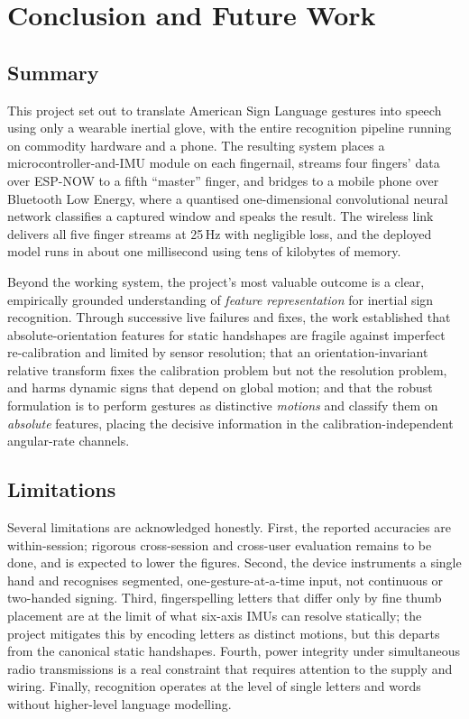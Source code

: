 \chapter{Conclusion and Future Work}

\section{Summary}

This project set out to translate American Sign Language gestures into speech
using only a wearable inertial glove, with the entire recognition pipeline
running on commodity hardware and a phone. The resulting system places a
microcontroller-and-IMU module on each fingernail, streams four fingers' data
over ESP-NOW to a fifth ``master'' finger, and bridges to a mobile phone over
Bluetooth Low Energy, where a quantised one-dimensional convolutional neural
network classifies a captured window and speaks the result. The wireless link
delivers all five finger streams at 25\,Hz with negligible loss, and the
deployed model runs in about one millisecond using tens of kilobytes of memory.

Beyond the working system, the project's most valuable outcome is a clear,
empirically grounded understanding of \emph{feature representation} for
inertial sign recognition. Through successive live failures and fixes, the work
established that absolute-orientation features for static handshapes are
fragile against imperfect re-calibration and limited by sensor resolution; that
an orientation-invariant relative transform fixes the calibration problem but
not the resolution problem, and harms dynamic signs that depend on global
motion; and that the robust formulation is to perform gestures as distinctive
\emph{motions} and classify them on \emph{absolute} features, placing the
decisive information in the calibration-independent angular-rate channels.

\section{Limitations}

Several limitations are acknowledged honestly. First, the reported accuracies
are within-session; rigorous cross-session and cross-user evaluation remains to
be done, and is expected to lower the figures. Second, the device instruments a
single hand and recognises segmented, one-gesture-at-a-time input, not
continuous or two-handed signing. Third, fingerspelling letters that differ
only by fine thumb placement are at the limit of what six-axis IMUs can resolve
statically; the project mitigates this by encoding letters as distinct motions,
but this departs from the canonical static handshapes. Fourth, power integrity
under simultaneous radio transmissions is a real constraint that requires
attention to the supply and wiring. Finally, recognition operates at the level
of single letters and words without higher-level language modelling.

